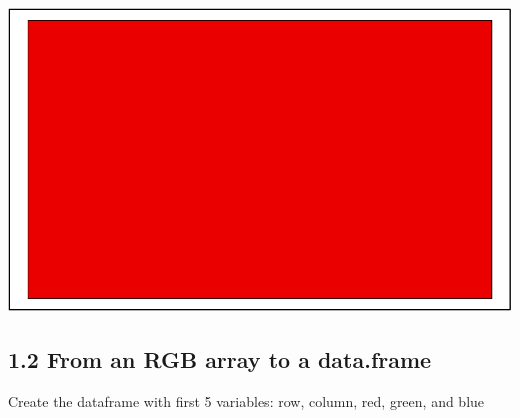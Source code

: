 \documentclass[]{article}
\begin{document}
\begin{center}\includegraphics{S2395479_Dai_files/figure-latex/unnamed-chunk-4-1} \end{center}

\hypertarget{from-an-rgb-array-to-a-data.frame}{%
\subsection{1.2 From an RGB array to a
data.frame}\label{from-an-rgb-array-to-a-data.frame}}

Create the dataframe with first 5 variables: row, column, red, green,
and blue
\end{document}
